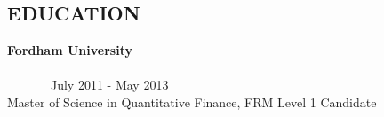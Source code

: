 \documentclass{res}
\begin{document}
\begin{resume}
\section{\textsc{EDUCATION}}

\textbf{Fordham University}  \ \ \ \ \ \ \ \ \ \ \ \ \ \ \ \ \ \ \ \ \ \ \ \ \ \ \ \ \ \ \ \ \ \ \ \ \ \ \ \ \ \ \ \ \ \ \ \ \ \ \ \ \ \ \ \ \ \ \ \ \ \ \ \ \ \ \ \ \ \ \ \ \ \ \ \ \ \ \ July 2011 - May 2013 \\
Master of Science in Quantitative Finance,  FRM Level 1 Candidate \\
\end{resume}
\end{document}
